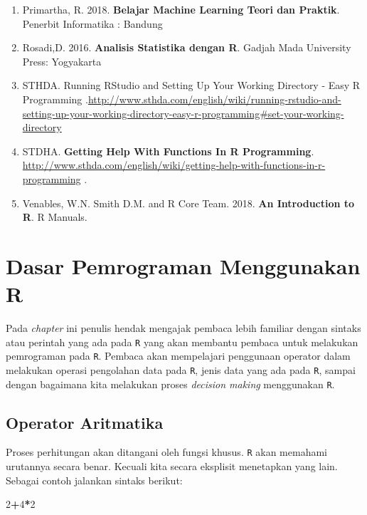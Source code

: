 \documentclass[]{book}
\newenvironment{Shaded}{\begin{snugshade}}{\end{snugshade}}
\newcommand{\DecValTok}[1]{\textcolor[rgb]{0.00,0.00,0.81}{#1}}
\newcommand{\OperatorTok}[1]{\textcolor[rgb]{0.81,0.36,0.00}{\textbf{#1}}}
\providecommand{\tightlist}{%
  \setlength{\itemsep}{0pt}\setlength{\parskip}{0pt}}
\begin{document}
\begin{enumerate}
\def\labelenumi{\arabic{enumi}.}
\tightlist
\item
  Primartha, R. 2018. \textbf{Belajar Machine Learning Teori dan
  Praktik}. Penerbit Informatika : Bandung
\item
  Rosadi,D. 2016. \textbf{Analisis Statistika dengan R}. Gadjah Mada
  University Press: Yogyakarta
\item
  STHDA. Running RStudio and Setting Up Your Working Directory - Easy R
  Programming
  .\url{http://www.sthda.com/english/wiki/running-rstudio-and-setting-up-your-working-directory-easy-r-programming\#set-your-working-directory}
\item
  STDHA. \textbf{Getting Help With Functions In R Programming}.
  \url{http://www.sthda.com/english/wiki/getting-help-with-functions-in-r-programming}
  .
\item
  Venables, W.N. Smith D.M. and R Core Team. 2018. \textbf{An
  Introduction to R}. R Manuals.
\end{enumerate}

\chapter{Dasar Pemrograman Menggunakan
R}\label{dasar-pemrograman-menggunakan-r}

Pada \emph{chapter} ini penulis hendak mengajak pembaca lebih familiar
dengan sintaks atau perintah yang ada pada \texttt{R} yang akan membantu
pembaca untuk melakukan pemrograman pada \texttt{R}. Pembaca akan
mempelajari penggunaan operator dalam melakukan operasi pengolahan data
pada \texttt{R}, jenis data yang ada pada \texttt{R}, sampai dengan
bagaimana kita melakukan proses \emph{decision making} menggunakan
\texttt{R}.

\section{Operator Aritmatika}\label{operator-aritmatika}

Proses perhitungan akan ditangani oleh fungsi khusus. \texttt{R} akan
memahami urutannya secara benar. Kecuali kita secara eksplisit
menetapkan yang lain. Sebagai contoh jalankan sintaks berikut:

\begin{Shaded}
\begin{Highlighting}[]
\DecValTok{2}\OperatorTok{+}\DecValTok{4}\OperatorTok{*}\DecValTok{2}
\end{Highlighting}
\end{Shaded}
\end{document}
